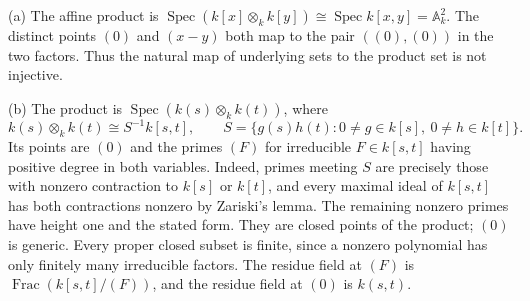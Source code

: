 (a) The affine product is $\operatorname{Spec}(k[x]\otimes_kk[y])\cong\operatorname{Spec}k[x,y]=\mathbb A_k^2$. The distinct points $(0)$ and $(x-y)$ both map to the pair $((0),(0))$ in the two factors. Thus the natural map of underlying sets to the product set is not injective.

(b) The product is $\operatorname{Spec}(k(s)\otimes_kk(t))$, where
\[k(s)\otimes_kk(t)\cong S^{-1}k[s,t],\qquad S=\{g(s)h(t):0\ne g\in k[s],\ 0\ne h\in k[t]\}.\]
Its points are $(0)$ and the primes $(F)$ for irreducible $F\in k[s,t]$ having positive degree in both variables. Indeed, primes meeting $S$ are precisely those with nonzero contraction to $k[s]$ or $k[t]$, and every maximal ideal of $k[s,t]$ has both contractions nonzero by Zariski's lemma. The remaining nonzero primes have height one and the stated form. They are closed points of the product; $(0)$ is generic. Every proper closed subset is finite, since a nonzero polynomial has only finitely many irreducible factors. The residue field at $(F)$ is $\operatorname{Frac}(k[s,t]/(F))$, and the residue field at $(0)$ is $k(s,t)$.
